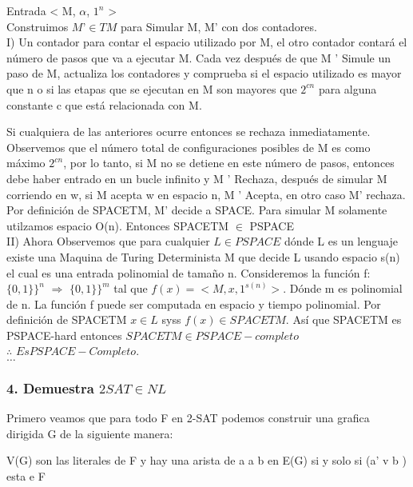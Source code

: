 \documentclass[12pt]{article}
\begin{document}
Entrada < M, $\alpha$, $1^{n}$ >\\

Construimos $M’\in TM$ para Simular M, M’ con dos contadores. \\

I) Un contador para contar el espacio utilizado por M, el otro contador contará el número de pasos que va a ejecutar M. Cada vez después de que M ' Simule un paso de M, actualiza los contadores y comprueba si el espacio utilizado 
es mayor que n o si las etapas que se ejecutan en M son mayores que $2^{cn}$  para alguna constante c que está relacionada con M. 

Si cualquiera de las anteriores ocurre entonces se rechaza inmediatamente.  Observemos que el número total de configuraciones posibles de M es como máximo $2^{cn}$, por lo tanto, si M no se detiene en este número de pasos, entonces debe haber entrado en un bucle infinito y M ' Rechaza, después de simular M corriendo en w, si M acepta w en espacio n, M ' Acepta, en otro caso M’ rechaza.
Por definición de SPACETM, M’ decide a SPACE. Para simular M solamente utilzamos espacio O(n). Entonces SPACETM $\in$ PSPACE\\

II) Ahora Observemos que para cualquier $L \in PSPACE$ dónde L es un lenguaje existe una Maquina de Turing Determinista M que decide L usando espacio s(n) el cual es una entrada polinomial de tamaño n.
Consideremos la función f: $\big \{0,1\}\big \}^{n}$ $\Rightarrow$ $\big \{0,1\}\big \}^{m}$ tal que
$f(x)=< M, x, 1^{s(n)}>.$ Dónde m es polinomial de n. La función f puede ser computada en espacio y tiempo polinomial. Por definición de SPACETM $x\in L$ syss $f(x)\in SPACETM.$ Así que SPACETM es PSPACE-hard entonces $SPACETM \in PSPACE-completo$ \\


$\therefore$ $ Es PSPACE-Completo.$\\



$\dots$

\subsubsection*{4. Demuestra $2SAT \in NL$}


Primero veamos que para todo F en 2-SAT podemos construir una grafica dirigida G de la siguiente manera:

	V(G) son las literales de F y hay una arista de a a b en E(G) si y solo si (a’ v b ) esta e F 
\end{document}
